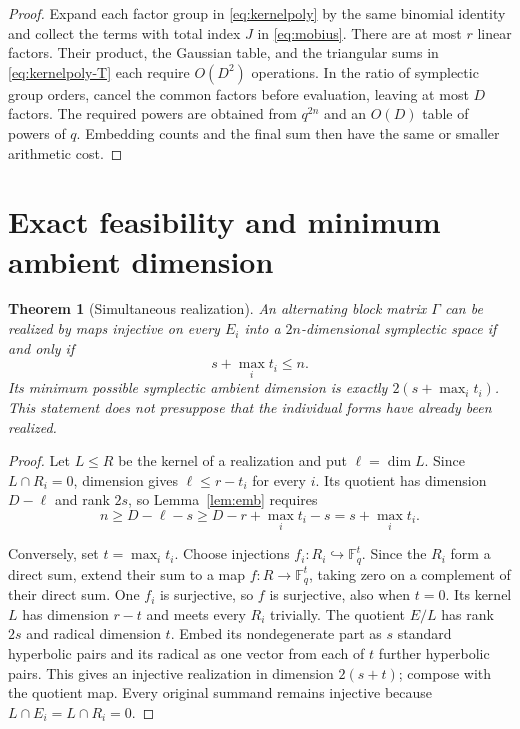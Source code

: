 \documentclass[11pt,letterpaper]{article}
\newtheorem{theorem}{Theorem}[section]
\theoremstyle{definition}
\theoremstyle{remark}
\newcommand{\F}{\mathbb F}
\begin{document}
\begin{proof}
Expand each factor group in \eqref{eq:kernelpoly} by the same binomial identity and collect the terms with total index $J$ in \eqref{eq:mobius}. There are at most $r$ linear factors. Their product, the Gaussian table, and the triangular sums in \eqref{eq:kernelpoly-T} each require $O(D^2)$ operations. In the ratio of symplectic group orders, cancel the common factors before evaluation, leaving at most $D$ factors. The required powers are obtained from $q^{2n}$ and an $O(D)$ table of powers of $q$. Embedding counts and the final sum then have the same or smaller arithmetic cost.
\end{proof}

\section{Exact feasibility and minimum ambient dimension}

\begin{theorem}[Simultaneous realization]\label{thm:support}
An alternating block matrix $\Gamma$ can be realized by maps injective on every $E_i$ into a $2n$-dimensional symplectic space if and only if
\begin{equation}\label{eq:support}
 s+\max_i t_i\le n.
\end{equation}
Its minimum possible symplectic ambient dimension is exactly $2(s+\max_i t_i)$. This statement does not presuppose that the individual forms have already been realized.
\end{theorem}

\begin{proof}
Let $L\le R$ be the kernel of a realization and put $\ell=\dim L$. Since $L\cap R_i=0$, dimension gives $\ell\le r-t_i$ for every $i$. Its quotient has dimension $D-\ell$ and rank $2s$, so Lemma~\ref{lem:emb} requires
\[
 n\ge D-\ell-s\ge D-r+\max_i t_i-s=s+\max_i t_i.
\]

Conversely, set $t=\max_i t_i$. Choose injections $f_i:R_i\hookrightarrow\F_q^t$. Since the $R_i$ form a direct sum, extend their sum to a map $f:R\to\F_q^t$, taking zero on a complement of their direct sum. One $f_i$ is surjective, so $f$ is surjective, also when $t=0$. Its kernel $L$ has dimension $r-t$ and meets every $R_i$ trivially. The quotient $E/L$ has rank $2s$ and radical dimension $t$. Embed its nondegenerate part as $s$ standard hyperbolic pairs and its radical as one vector from each of $t$ further hyperbolic pairs. This gives an injective realization in dimension $2(s+t)$; compose with the quotient map. Every original summand remains injective because $L\cap E_i=L\cap R_i=0$.
\end{proof}
\end{document}
